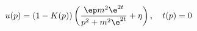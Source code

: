 \begin{equation}
u(p) = (1 - K(p)) \left( \frac{\ep m^2 \e^{2t}}{p^2 + m^2 \e^{2t}}
+ \eta \right),\quad t(p) = 0
\end{equation} 
